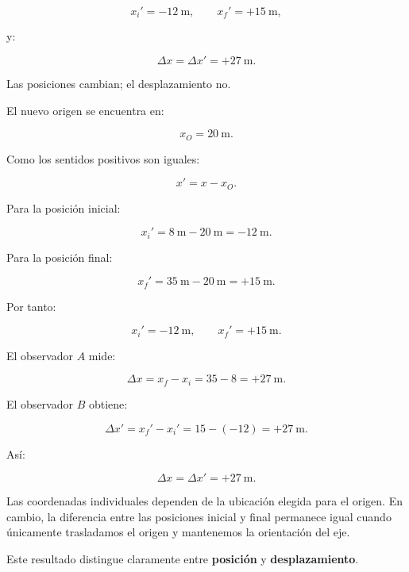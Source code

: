 \begin{respuesta}
\[
x_i'=-\SI{12}{\meter},
\qquad
x_f'=+\SI{15}{\meter},
\]

y:

\[
\Delta x=\Delta x'=+\SI{27}{\meter}.
\]

Las posiciones cambian; el desplazamiento no.
\end{respuesta}

\begin{explicacion}
El nuevo origen se encuentra en:

\[ x_O=\SI{20}{\meter}. \]

Como los sentidos positivos son iguales:

\[ x'=x-x_O. \]

Para la posición inicial:

\[
x_i'
=
\SI{8}{\meter}
-
\SI{20}{\meter}
=
-\SI{12}{\meter}.
\]

Para la posición final:

\[
x_f'
=
\SI{35}{\meter}
-
\SI{20}{\meter}
=
+\SI{15}{\meter}.
\]

Por tanto:

\[
\boxed{x_i'=-\SI{12}{\meter}},
\qquad
\boxed{x_f'=+\SI{15}{\meter}}.
\]

El observador \(A\) mide:

\[
\Delta x
=
x_f-x_i
=
35-8
=
+\SI{27}{\meter}.
\]

El observador \(B\) obtiene:

\[
\Delta x'
=
x_f'-x_i'
=
15-(-12)
=
+\SI{27}{\meter}.
\]

Así:

\[ \boxed{\Delta x=\Delta x'=+\SI{27}{\meter}}. \]

Las coordenadas individuales dependen de la ubicación elegida para el origen. En cambio, la diferencia entre las posiciones inicial y final permanece igual cuando únicamente trasladamos el origen y mantenemos la orientación del eje.

Este resultado distingue claramente entre \textbf{posición} y \textbf{desplazamiento}.
\end{explicacion}